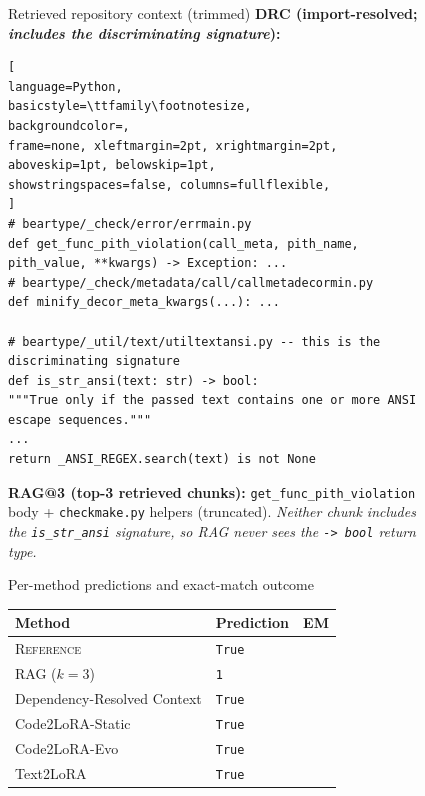 \documentclass{llmxive}
\providecommand{\codelora}{Code2LoRA\xspace}
\providecommand{\codelorastatic}{\codelora-Static\xspace}
\providecommand{\codeloraevo}{\codelora-Evo\xspace}
\providecommand{\textlora}{Text2LoRA\xspace}
\begin{document}
\begin{figure}[!htbp]
\begin{center}
\begin{tcolorbox}
\begin{qexsection}{Retrieved repository context (trimmed)}
\textbf{\footnotesize DRC (import-resolved; \emph{includes the discriminating signature}):}
\begin{lstlisting}[
language=Python,
basicstyle=\ttfamily\footnotesize,
backgroundcolor=,
frame=none, xleftmargin=2pt, xrightmargin=2pt,
aboveskip=1pt, belowskip=1pt,
showstringspaces=false, columns=fullflexible,
]
# beartype/_check/error/errmain.py
def get_func_pith_violation(call_meta, pith_name,
pith_value, **kwargs) -> Exception: ...
# beartype/_check/metadata/call/callmetadecormin.py
def minify_decor_meta_kwargs(...): ...

# beartype/_util/text/utiltextansi.py -- this is the discriminating signature
def is_str_ansi(text: str) -> bool:
"""True only if the passed text contains one or more ANSI escape sequences."""
...
return _ANSI_REGEX.search(text) is not None
\end{lstlisting}
\textbf{\footnotesize RAG@3 (top-3 retrieved chunks):} \texttt{get\_func\_pith\_violation} body + \texttt{checkmake.py} helpers (truncated). \emph{Neither chunk includes the \texttt{is\_str\_ansi} signature, so RAG never sees the \texttt{->\,bool} return type.}
\end{qexsection}

\begin{qexsection}{Per-method predictions and exact-match outcome}
\footnotesize
\setlength{\tabcolsep}{6pt}
\begin{tabular}{@{}llc@{}}
\toprule
Method & Prediction & EM \\
\midrule
\textsc{Reference}                            & \texttt{True}  & \\
\midrule
RAG ($k\!=\!3$)                               & \texttt{1}     &  \\
Dependency-Resolved Context                   & \texttt{True}  &  \\
\codelorastatic{}                             & \texttt{True}  &  \\
\codeloraevo{}                                & \texttt{True}  &  \\
\textlora{}                                   & \texttt{True}  &  \\
\bottomrule
\end{tabular}
\end{qexsection}


\end{tcolorbox}
\end{center}
\end{figure}
\end{document}
